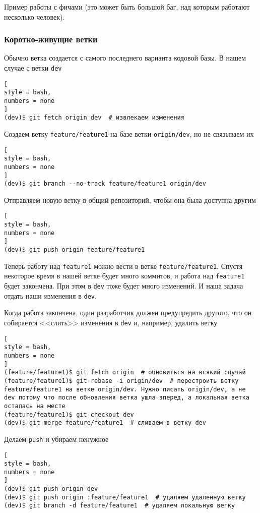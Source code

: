 \documentclass[%
	11pt,
	a4paper,
	utf8,
		]{article}
\begin{document}
Пример работы с фичами (это может быть большой баг, над которым работают несколько человек).

\subsubsection{Коротко-живущие ветки}

Обычно ветка создается с самого последнего варианта кодовой базы. В нашем случае с ветки \texttt{dev}
\begin{lstlisting}[
style = bash,
numbers = none
]
(dev)$ git fetch origin dev  # извлекаем изменения
\end{lstlisting}

Создаем ветку \texttt{feature/feature1} на базе ветки \texttt{origin/dev}, но не связываем их
\begin{lstlisting}[
style = bash,
numbers = none
]
(dev)$ git branch --no-track feature/feature1 origin/dev
\end{lstlisting}

Отправляем новую ветку в общий репозиторий, чтобы она была доступна другим
\begin{lstlisting}[
style = bash,
numbers = none
]
(dev)$ git push origin feature/feature1
\end{lstlisting}

Теперь работу над \texttt{feature1} можно вести в ветке \texttt{feature/feature1}. Спустя некоторое время в нашей ветке будет много коммитов, и работа над \texttt{feature1} будет закончена. При этом в \texttt{dev} тоже будет много изменений. И наша задача отдать наши изменения в \texttt{dev}.

Когда работа закончена, один разработчик должен предупредить другого, что он собирается <<слить>> изменения в \texttt{dev} и, например, удалить ветку
\begin{lstlisting}[
style = bash,
numbers = none
]
(feature/feature1)$ git fetch origin  # обновиться на всякий случай
(feature/feature1)$ git rebase -i origin/dev  # перестроить ветку feature/feature1 на ветке origin/dev. Нужно писать origin/dev, а не dev потому что после обновления ветка ушла вперед, а локальная ветка осталась на месте
(feature/feature1)$ git checkout dev
(dev)$ git merge feature/feature1  # сливаем в ветку dev
\end{lstlisting}

Делаем \texttt{push} и убираем ненужное
\begin{lstlisting}[
style = bash,
numbers = none
]
(dev)$ git push origin dev
(dev)$ git push origin :feature/feature1  # удаляем удаленную ветку
(dev)$ git branch -d feature/feature1  # удаляем локальную ветку
\end{lstlisting}
\end{document}
